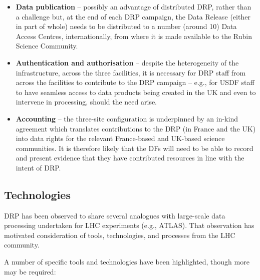 \begin{itemize}
\item {\bf Data publication} -- possibly an advantage of distributed DRP, rather than a challenge but, at the end of each DRP campaign, the Data Release (either in part of whole) needs to be distributed to a number (around 10) Data Access Centres, internationally, from where it is made available to the Rubin Science Community.

\item {\bf Authentication and authorisation} -- despite the heterogeneity of the infrastructure, across the three facilities, it is necessary for DRP staff from across the facilities to contribute to the DRP campaign – e.g., for USDF staff to have seamless access to data products being created in the UK and even to intervene in processing, should the need arise.

\item {\bf Accounting} -- the three-site configuration is underpinned by an in-kind agreement which translates contributions to the DRP (in France and the UK) into data rights for the relevant France-based and UK-based science communities. It is therefore likely that the DFs will need to be able to record and present evidence that they have contributed resources in line with the intent of DRP. 

\end{itemize}


\subsection{Technologies}

DRP has been observed to share several analogues with large-scale data processing undertaken for LHC experiments (e.g., ATLAS). That observation has motivated consideration of tools, technologies, and processes from the LHC community. 

A number of specific tools and technologies have been highlighted, though more may be required:

